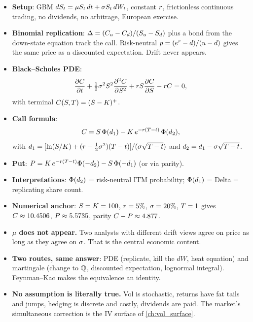 \begin{itemize}
  \item \textbf{Setup}: GBM
  $dS_t = \mu S_t\,dt + \sigma S_t\,dW_t$, constant
  $r$, frictionless continuous trading, no dividends, no
  arbitrage, European exercise.
  \item \textbf{Binomial replication}: $\Delta =
  (C_u - C_d)/(S_u - S_d)$ plus a bond from the
  down-state equation track the call. Risk-neutral
  $p = (e^{r} - d)/(u - d)$ gives the same price as a
  discounted expectation. Drift never appears.
  \item \textbf{Black--Scholes PDE}:
  \[
    \frac{\partial C}{\partial t}
    + \tfrac{1}{2}\sigma^2S^2
          \frac{\partial^2 C}{\partial S^2}
    + rS\frac{\partial C}{\partial S}
    - rC = 0,
  \]
  with terminal $C(S, T) = (S - K)^+$.
  \item \textbf{Call formula}:
  \[
    C = S\,\Phi(d_1) - K\,e^{-r(T - t)}\,
    \Phi(d_2),
  \]
  with $d_1 = [\ln(S/K) + (r + \tfrac12\sigma^2)
  (T - t)]/(\sigma\sqrt{T - t})$ and
  $d_2 = d_1 - \sigma\sqrt{T - t}$.
  \item \textbf{Put}:
  $P = K\,e^{-r(T - t)}\Phi(-d_2)
   - S\,\Phi(-d_1)$ (or via parity).
  \item \textbf{Interpretations}: $\Phi(d_2)$ = risk-neutral
  ITM probability; $\Phi(d_1)$ = Delta = replicating share
  count.
  \item \textbf{Numerical anchor}: $S = K = 100$,
  $r = 5\%$, $\sigma = 20\%$, $T = 1$ gives
  $C \approx 10.4506$, $P \approx 5.5735$, parity
  $C - P \approx 4.877$.
  \item \textbf{$\mu$ does not appear.} Two analysts with
  different drift views agree on price as long as they agree on
  $\sigma$. That is the central economic content.
  \item \textbf{Two routes, same answer}: PDE (replicate, kill
  the $dW$, heat equation) and martingale (change to $\mathbb{Q}$,
  discounted expectation, lognormal integral). Feynman--Kac
  makes the equivalence an identity.
  \item \textbf{No assumption is literally true.} Vol is
  stochastic, returns have fat tails and jumps, hedging is
  discrete and costly, dividends are paid. The market's
  simultaneous correction is the IV surface of
  \cref{ch:vol_surface}.
\end{itemize}
